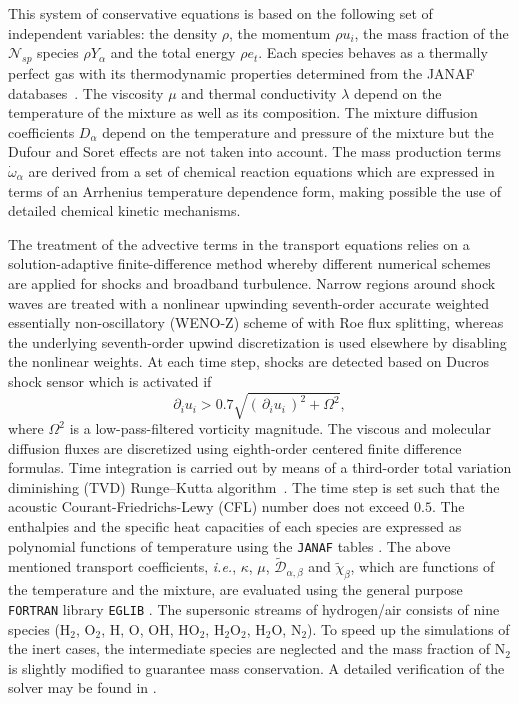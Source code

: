 \documentclass[conf]{new-aiaa}
\newcommand{\pars}[1]{\left(\,{#1}\,\right)}
\newcommand{\addim}[1]{{#1}} %
\newcommand{\nspc}{\mathcal{N}_{sp}}
\begin{document}
%
This system of conservative equations is based on the following set of independent variables: the density $\addim{\rho}$, the momentum $\addim{\rho} \addim{u}_i$, the mass fraction of the $\nspc$ species $\addim{\rho} Y_{\alpha}$ and the total energy $\addim{\rho} \addim{e}_t$.
%
Each species behaves as a thermally perfect gas with its thermodynamic properties determined from the JANAF databases~\cite{stull1971janaf}.
%
The viscosity $\addim{\mu}$ and thermal conductivity $\addim{\lambda}$ depend on the temperature of the mixture as well as its composition.
%
The mixture diffusion coefficients $\addim{D}_{\alpha}$ depend on the temperature and pressure of the mixture but the Dufour and Soret effects are not taken into account.
%
The mass production terms $\addim{\dot{\omega}}_\alpha$ are derived from a set of chemical reaction equations which are expressed in terms of an Arrhenius temperature dependence form, making possible the use of detailed chemical kinetic mechanisms.

The treatment of the advective terms in the transport equations relies on a solution-adaptive finite-difference method whereby different numerical schemes are applied for shocks and broadband turbulence.
%
Narrow regions around shock waves are treated with a nonlinear upwinding seventh-order accurate weighted essentially non-oscillatory (WENO-Z) scheme of \citet{don2013accuracy} with Roe flux splitting, whereas the underlying seventh-order upwind discretization is used elsewhere by disabling the nonlinear weights.
%
At each time step, shocks are detected based on Ducros \cite{ducros1999large} shock sensor which is activated if
\begin{equation}
\partial_i u_i>0.7\sqrt{\pars{\partial_i u_i}^2+\Omega^2},
\end{equation}
%
where $\Omega^2$ is a low-pass-filtered vorticity magnitude.
%
The viscous and molecular diffusion fluxes are discretized using eighth-order centered finite difference formulas.
%
Time integration is carried out by means of a third-order total variation diminishing (TVD) Runge--Kutta algorithm~\cite{gottlieb1998total}.
%
The time step is set such that the acoustic Courant-Friedrichs-Lewy (CFL) number does not exceed $0.5$.
%
The enthalpies and the specific heat capacities of each species are expressed as polynomial functions of temperature using the \texttt{JANAF} tables \cite{stull1971janaf}. %
The above mentioned transport coefficients, \textit{i.e.}, $\kappa$, $\mu$, $\widetilde{\mathcal{D}}_{\alpha,\beta}$ and $\tilde{\chi}_{\beta}$, which are functions of the temperature and the mixture, are evaluated using the general purpose \texttt{FORTRAN} library \texttt{EGLIB} \cite{ern2004eglib}.
%
The supersonic streams of hydrogen/air consists of nine species ($\mathrm{H_2}$, $\mathrm{O_2}$, $\mathrm{H}$, $\mathrm{O}$, $\mathrm{OH}$, $\mathrm{HO_2}$, $\mathrm{H_2O_2}$, $\mathrm{H_2O}$, $\mathrm{N_2}$).
%
To speed up the simulations of the inert cases, the intermediate species are neglected and the mass fraction of $\mathrm{N_2}$ is slightly modified to guarantee mass conservation.
%
A detailed verification of the solver may be found in \cite{boukharfane2018contribution}.
%
\end{document}
